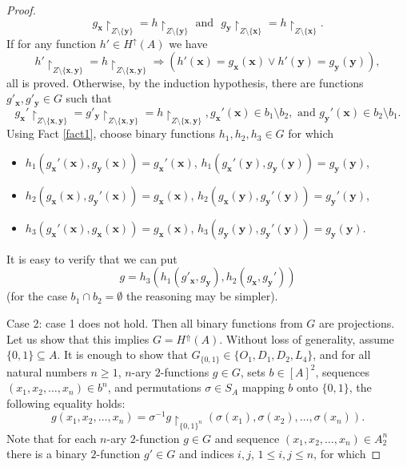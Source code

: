 \documentclass[graybox]{SNmult}
\theoremstyle{definition}
\begin{document}
\begin{proof}
	$$
	g_{\bm x}\restriction_{Z\setminus \{\bm y\}}=h\restriction_{Z\setminus \{\bm y\}}\text{ and }\,\,g_{\bm y}\restriction_{Z\setminus \{\bm x\}}=h\restriction_{Z\setminus \{\bm x\}}.
	$$
	If for any function $h'\in H^\uparrow(A)$ we have
	$$
	h'\restriction_{Z\setminus \{\bm x, \bm y\}}= h\restriction_{Z\setminus \{\bm x, \bm y\}}\Rightarrow (h'(\bm x)=g_{\bm x}(\bm x)\vee h'(\bm y)=g_{\bm y}(\bm y)),
	$$
	all is proved. Otherwise, by the induction hypothesis, there are functions $g'_{\bm x}, g'_{\bm y}\in G$ such that 
	$$
	g_{\bm x}'\restriction_{Z\setminus \{\bm x, \bm y\}}=g'_{\bm y}\restriction_{Z\setminus \{\bm x, \bm y\}}=h\restriction_{Z\setminus \{\bm x, \bm y\}}, g_{\bm x}'(\bm x)\in b_1\setminus b_2, \text{ and } g_{\bm y}'(\bm x)\in b_2\setminus b_1.
	$$
	Using Fact \ref{fact1}, choose binary functions $h_1, h_2, h_3\in G$ for which
	\begin{itemize}
		\item $h_1(g_{\bm x}'(\bm x), g_{\bm y}(\bm x))=g_{\bm x}'(\bm x)$, $h_1(g_{\bm x}'(\bm y), g_{\bm y}(\bm y))=g_{\bm y}(\bm y)$, 
		\item $h_2(g_{\bm x}(\bm x), g_{\bm y}'(\bm x))=g_{\bm x}(\bm x)$, $h_2(g_{\bm x}(\bm y), g_{\bm y}'(\bm y))=g_{\bm y}'(\bm y)$,
		\item $h_3(g_{\bm x}'(\bm x), g_{\bm x}(\bm x))=g_{\bm x}(\bm x)$, $h_3(g_{\bm y}(\bm y), g_{\bm y}'(\bm y))=g_{\bm y}(\bm y)$.
	\end{itemize}
	It is easy to verify that we can put $$g=h_3(h_1(g'_{\bm x}, g_{\bm y}), h_2(g_{\bm x}, g_{\bm y}'))$$
	(for the case $b_1\cap b_2=\emptyset$ the reasoning may be simpler).
	\par Case 2: case 1 does not hold. Then all binary functions from $G$ are projections. Let us show that this implies $G=H^\Uparrow(A)$. Without loss of generality, assume $\{0,1\}\subseteq A$. It is enough to show that $G_{\{0,1\}}\in \{O_1, D_1, D_2, L_4\}$, and for all natural numbers $n\geq 1$, $n$-ary $2$-functions $g\in G$, sets $b\in [A]^2$, sequences $(x_1, x_2, \ldots, x_n)\in b^n$, and permutations $\sigma\in S_A$ mapping $b$ onto $\{0,1\}$, the following equality holds:
	\begin{equation}\label{eq1}
		g(x_1, x_2, \ldots, x_n)=\sigma^{-1}g\restriction_{\{0,1\}^n}(\sigma(x_1), \sigma(x_2), \ldots, \sigma(x_n)).
	\end{equation}
	Note that for each $n$-ary $2$-function $g\in G$ and sequence $(x_1, x_2, \ldots, x_n)\in A^n_2$ there is a binary $2$-function $g'\in G$ and indices $i,j$, $1\leq i,j\leq n$, for which 

\end{proof}
\end{document}

